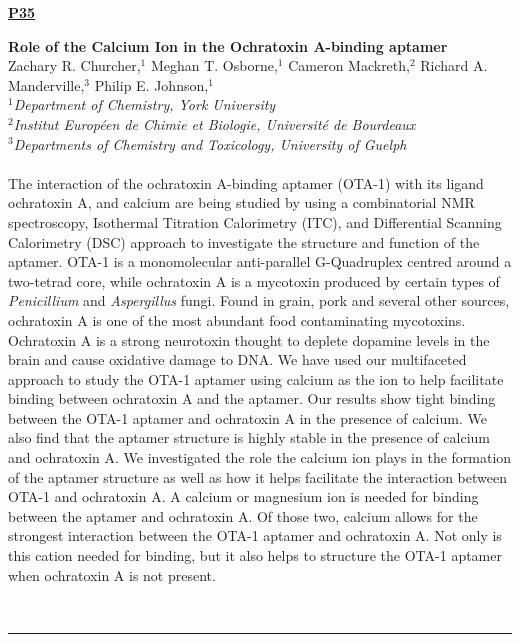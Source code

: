 \documentclass[titlepage,oneside,openany,10pt]{book}
\newenvironment{posterabs}[4] %
        {
	\begin{flushright}
                \underline{\textbf{#4}}
        \end{flushright}
        \textbf{#1}\\%
        #2\\%
        \textit{#3}\\\\%
        }
        {
        \\
        \noindent\rule{15cm}{0.5pt}%
        }
\begin{document}
\newpage

\begin{posterabs}
    {Role of the Calcium Ion in the Ochratoxin A-binding aptamer}
    {Zachary R. Churcher,$^{1}$ Meghan T. Osborne,$^{1}$ Cameron Mackreth,$^{2}$ Richard A. Manderville,$^{3}$ Philip E. Johnson,$^{1}$}
    {
    $^1$Department of Chemistry, York University\\
    $^2$Institut Europ\'{e}en de Chimie et Biologie, Universit\'{e} de Bourdeaux\\
    $^3$Departments of Chemistry and Toxicology, University of Guelph
    }
    {P35}
    The interaction of the ochratoxin A-binding aptamer (OTA-1) with its ligand ochratoxin A, and calcium are being studied by using a combinatorial NMR spectroscopy, Isothermal Titration Calorimetry (ITC), and Differential Scanning Calorimetry (DSC) approach to investigate the structure and function of the aptamer. OTA-1 is a monomolecular anti-parallel G-Quadruplex centred around a two-tetrad core, while ochratoxin A is a mycotoxin produced by certain types of \emph{Penicillium} and \emph{Aspergillus} fungi. Found in grain, pork and several other sources, ochratoxin A is one of the most abundant food contaminating mycotoxins. Ochratoxin A is a strong neurotoxin thought to deplete dopamine levels in the brain and cause oxidative damage to DNA. We have used our multifaceted approach to study the OTA-1 aptamer using calcium as the ion to help facilitate binding between ochratoxin A and the aptamer. Our results show tight binding between the OTA-1 aptamer and ochratoxin A in the presence of calcium. We also find that the aptamer structure is highly stable in the presence of calcium and ochratoxin A. We investigated the role the calcium ion plays in the formation of the aptamer structure as well as how it helps facilitate the interaction between OTA-1 and ochratoxin A. A calcium or magnesium ion is needed for binding between the aptamer and ochratoxin A. Of those two, calcium allows for the strongest interaction between the OTA-1 aptamer and ochratoxin A. Not only is this cation needed for binding, but it also helps to structure the OTA-1 aptamer when ochratoxin A is not present.
    \label{ChurcherZ}
\end{posterabs}

\newpage
\end{document}
